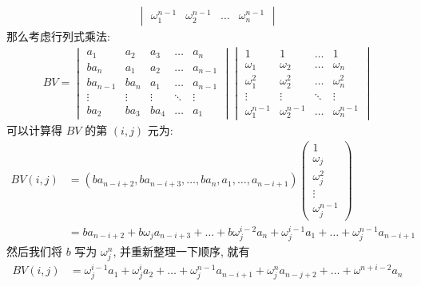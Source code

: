 \begin{exercise}[series=exer]
\begin{answer}
\begin{align*}
\begin{vmatrix}
              \omega_{1}^{n-1} & \omega_{2}^{n-1} & \dots & \omega_{n}^{n-1}
          \end{vmatrix}
      \end{align*}
      那么考虑行列式乘法:
      \begin{align*}
          BV =
          \begin{vmatrix}
              a_{1}   & a_{2} & a_{3} & \ldots    & a_{n} \\
              ba_{n}  & a_{1} & a_{2} & \ldots    & a_{n-1} \\
              ba_{n-1}    & ba_{n}    & a_{1} & \ldots & a_{n-1} \\
              \vdots  & \vdots & \vdots & \ddots & \vdots \\
              ba_{2} & ba_{3} & ba_{4} & \ldots & a_{1}
          \end{vmatrix}
          \begin{vmatrix}
              1 & 1 & \dots & 1\\
              \omega_{1} & \omega_{2} & \dots & \omega_{n}\\
              \omega_{1}^{2} & \omega_{2}^{2} & \dots & \omega_{n}^{2}\\
              \vdots & \vdots & \ddots & \vdots\\
              \omega_{1}^{n-1} & \omega_{2}^{n-1} & \dots & \omega_{n}^{n-1}
          \end{vmatrix}
      \end{align*}
      可以计算得 $ BV $ 的第 $ (i, j) $ 元为:
      \begin{align*}
          BV(i, j) & = (ba_{n-i+2}, ba_{n-i+3}, \dots, ba_{n}, a_{1}, \dots, a_{n-i+1})\begin{pmatrix}
              1 \\ \omega_{j} \\ \omega_{j}^{2} \\ \vdots \\ \omega_{j}^{n-1}
          \end{pmatrix}\\
          & = ba_{n-i+2} + b\omega_{j}a_{n-i+3} + \dots + b\omega_{j}^{i-2}a_{n} + \omega_{j}^{i-1}a_{1} + \dots + \omega_{j}^{n-1}a_{n-i+1}
      \end{align*}
      然后我们将 $ b $ 写为 $ \omega_{j}^{n} $, 并重新整理一下顺序, 就有
      \begin{align*}
          BV(i, j) & = \omega_{j}^{i-1}a_{1} + \omega_{j}^{i}a_{2} + \dots + \omega_{j}^{n-1}a_{n-i+1} + \omega_{j}^{n}a_{n-j+2} + \dots + \omega^{n+i-2}a_{n}\\

\end{align*}
\end{answer}
\end{exercise}

